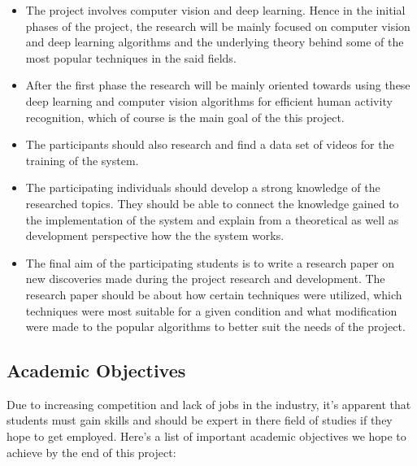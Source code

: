 \documentclass[11pt]{article}
\begin{document}
\begin{itemize}
	\item The project involves computer vision and deep learning. Hence in the initial phases of the project, the research will be mainly focused on computer vision and deep learning algorithms and the underlying theory behind some of the most popular techniques in the said fields. 
	\item After the first phase the research will be mainly oriented towards using these deep learning and computer vision algorithms for efficient human activity recognition, which of course is the main goal of the this project. 
	\item The participants should also research and find a data set of videos for the training of the system. 
	\item The participating individuals should develop a strong knowledge of the researched topics. They should be able to connect the knowledge gained to the implementation of the system and explain from a theoretical as well as development perspective how the the system works.  
	\item The final aim of the participating students is to write a research paper on new discoveries made during the project research and development. The research paper should be about how certain techniques were utilized, which techniques were most suitable for a given condition and what modification were made to the popular algorithms to better suit the needs of the project. 
	
\end{itemize}
\subsection{\textbf{Academic Objectives}}
Due to increasing competition and lack of jobs in the industry, it's apparent that students must gain skills and should be expert in there field of studies if they hope to get employed.  
Here's a list of important academic objectives we hope to achieve by the end of this project:
\end{document}
